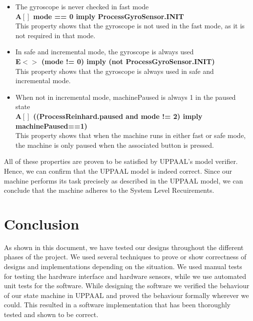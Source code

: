 \documentclass[a4paper,oneside,11pt]{article}
\begin{document}
\begin{itemize}
	\item The gyroscope is never checked in fast mode\\
		\textbf{A$[]$ mode == 0 imply ProcessGyroSensor.INIT}\\
		This property shows that the gyroscope is not used in the fast mode, as it is not required in that mode. 

	\item In safe and incremental mode, the gyroscope is always used\\
		\textbf{E$<>$ (mode != 0) imply (not ProcessGyroSensor.INIT)}\\
		This property shows that the gyroscope is always used in safe and incremental mode. 

	\item When not in incremental mode, machinePaused is always 1 in the paused state\\
		\textbf{A$[]$ ((ProcessReinhard.paused and mode != 2) imply machinePaused==1)}\\
		This property shows that when the machine runs in either fast or safe mode, the machine is only paused when the associated button is pressed.
\end{itemize}

All of these properties are proven to be satisfied by UPPAAL’s model verifier. Hence, we can confirm that the UPPAAL model is indeed correct. Since our machine performs its task precisely as described in the UPPAAL model, we can conclude that the machine adheres to the System Level Recuirements.

\section{Conclusion}
As shown in this document, we have tested our designs throughout the different phases of the project. We used several techniques to prove or show correctness of designs and implementations depending on the situation. We used manual tests for testing the hardware interface and hardware sensors, while we use automated unit tests for the software. While designing the software we verified the behaviour of our state machine in UPPAAL and proved the behaviour formally wherever we could. This resulted in a software implementation that has been thoroughly tested and shown to be correct.
\end{document}
